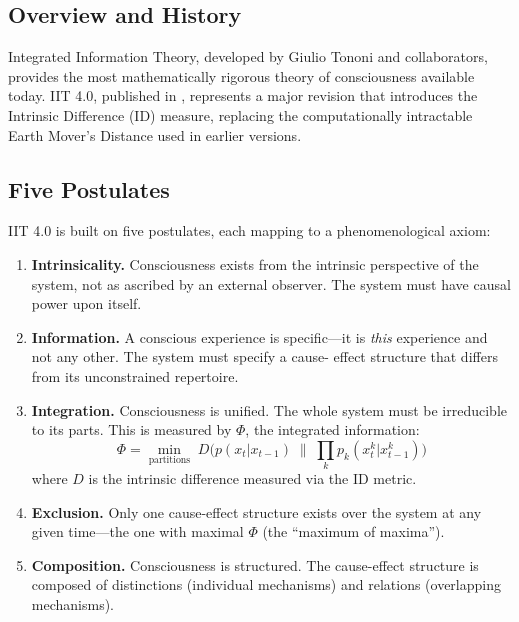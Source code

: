 \documentclass[12pt,a4paper]{article}
\begin{document}
\subsection{Overview and History}

Integrated Information Theory, developed by Giulio Tononi and collaborators,
provides the most mathematically rigorous theory of consciousness available
today. IIT 4.0, published in \cite{Albantakis2023}, represents a major revision
that introduces the Intrinsic Difference (ID) measure, replacing the
computationally intractable Earth Mover's Distance used in earlier versions.

\subsection{Five Postulates}

IIT 4.0 is built on five postulates, each mapping to a phenomenological axiom:

\begin{enumerate}[leftmargin=2em]
  \item \textbf{Intrinsicality.} Consciousness exists from the intrinsic
    perspective of the system, not as ascribed by an external observer. The
    system must have causal power upon itself.

  \item \textbf{Information.} A conscious experience is specific---it is
    \emph{this} experience and not any other. The system must specify a cause-
    effect structure that differs from its unconstrained repertoire.

  \item \textbf{Integration.} Consciousness is unified. The whole system must
    be irreducible to its parts. This is measured by $\Phi$, the integrated
    information:
    \begin{equation}
    \Phi = \min_{\text{partitions}} \; D\bigl(p(x_t | x_{t-1}) \;\|\;
    \textstyle\prod_k p_k(x^k_t | x^k_{t-1})\bigr)
    \label{eq:phi_iit}
    \end{equation}
    where $D$ is the intrinsic difference measured via the ID metric.

  \item \textbf{Exclusion.} Only one cause-effect structure exists over the
    system at any given time---the one with maximal $\Phi$ (the
    ``maximum of maxima'').

  \item \textbf{Composition.} Consciousness is structured. The cause-effect
    structure is composed of distinctions (individual mechanisms) and
    relations (overlapping mechanisms).
\end{enumerate}
\end{document}
